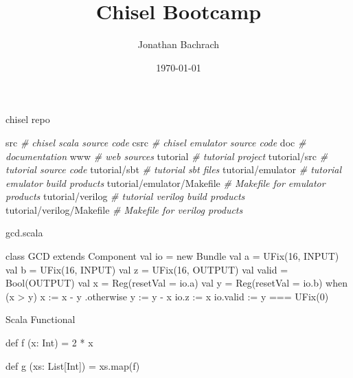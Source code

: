 \documentclass[xcolor=pdflatex,dvipsnames,table]{beamer}
\title{Chisel Bootcamp}
\author{Jonathan Bachrach}
\date{\today}
\institute[UC Berkeley]{EECS UC Berkeley}
\newenvironment{FramedSemiVerb}%
{\begin{Sbox}\begin{minipage}{.94\textwidth}\begin{semiverbatim}}%
{\end{semiverbatim}\end{minipage}\end{Sbox}
\setlength{\fboxsep}{8pt}\fbox{\TheSbox}}
\newcommand{\comment}[1]{{\color{Green}\it\smaller #1}}
\begin{document}
\begin{frame}
\titlepage
\end{frame}

\begin{frame}[fragile]{chisel repo}
\begin{FramedSemiVerb}
src                        \comment{\# chisel scala source code}
csrc                       \comment{\# chisel emulator source code}
doc                        \comment{\# documentation}
www                        \comment{\# web sources}
tutorial                   \comment{\# tutorial project}
tutorial/src               \comment{\# tutorial source code}
tutorial/sbt               \comment{\# tutorial sbt files}
tutorial/emulator          \comment{\# tutorial emulator build products}
tutorial/emulator/Makefile \comment{\# Makefile for emulator products} 
tutorial/verilog           \comment{\# tutorial verilog build products} 
tutorial/verilog/Makefile  \comment{\# Makefile for verilog products} 
\end{FramedSemiVerb}
\end{frame}

% 
% 
% 

\begin{frame}[fragile]{gcd.scala}
\begin{scala}
class GCD extends Component {
  val io = new Bundle {
    val a     = UFix(16, INPUT)
    val b     = UFix(16, INPUT)
    val z     = UFix(16, OUTPUT)
    val valid = Bool(OUTPUT)
  }
  val x  = Reg(resetVal = io.a)
  val y  = Reg(resetVal = io.b)
  when (x > y) { 
    x := x - y 
  } .otherwise { 
    y := y - x 
  }
  io.z     := x
  io.valid := y === UFix(0)
}
\end{scala}
\end{frame}

\begin{frame}[fragile]{Scala Functional}

\begin{scala}
def f (x: Int) = 2 * x

def g (xs: List[Int]) =  xs.map(f)
\end{scala}
\end{frame}
\end{document}
